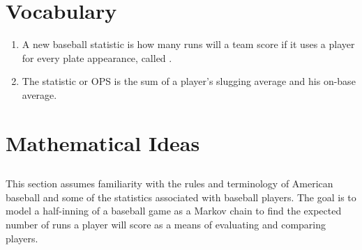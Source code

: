\documentclass[12pt]{article}
\begin{document}
\hr

\section*{Vocabulary}
\begin{enumerate}
    \item
        A new baseball statistic is how many runs will a team score if it
        uses a player for every plate appearance, called .
    \item
        The  statistic or OPS is the sum of
        a player's slugging average and his on-base average.
\end{enumerate}

\hr

\section*{Mathematical Ideas}
\subsection*{}

This section assumes familiarity with the rules and terminology of
American baseball%
and some of the statistics associated with baseball players.  The goal
is to model a half-inning of a baseball game as a Markov chain to find
the expected number of runs a player will score as a means of evaluating
and comparing players.
\end{document}

